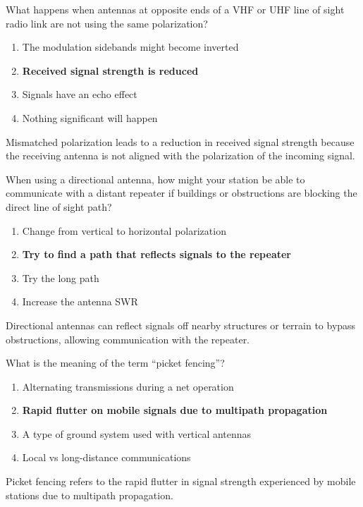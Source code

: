 
\begin{tcolorbox}[colback=gray!10!white,colframe=black!75!black,title={T3A04}]
    What happens when antennas at opposite ends of a VHF or UHF line of sight radio link are not using the same polarization?
    \begin{enumerate}[label=\Alph*),noitemsep]
        \item The modulation sidebands might become inverted
        \item \textbf{Received signal strength is reduced}
        \item Signals have an echo effect
        \item Nothing significant will happen
    \end{enumerate}
\end{tcolorbox}
Mismatched polarization leads to a reduction in received signal strength because the receiving antenna is not aligned with the polarization of the incoming signal.


\begin{tcolorbox}[colback=gray!10!white,colframe=black!75!black,title={T3A05}]
    When using a directional antenna, how might your station be able to communicate with a distant repeater if buildings or obstructions are blocking the direct line of sight path?
    \begin{enumerate}[label=\Alph*),noitemsep]
        \item Change from vertical to horizontal polarization
        \item \textbf{Try to find a path that reflects signals to the repeater}
        \item Try the long path
        \item Increase the antenna SWR
    \end{enumerate}
\end{tcolorbox}
Directional antennas can reflect signals off nearby structures or terrain to bypass obstructions, allowing communication with the repeater.


\begin{tcolorbox}[colback=gray!10!white,colframe=black!75!black,title={T3A06}]
    What is the meaning of the term “picket fencing”?
    \begin{enumerate}[label=\Alph*),noitemsep]
        \item Alternating transmissions during a net operation
        \item \textbf{Rapid flutter on mobile signals due to multipath propagation}
        \item A type of ground system used with vertical antennas
        \item Local vs long-distance communications
    \end{enumerate}
\end{tcolorbox}
Picket fencing refers to the rapid flutter in signal strength experienced by mobile stations due to multipath propagation.

